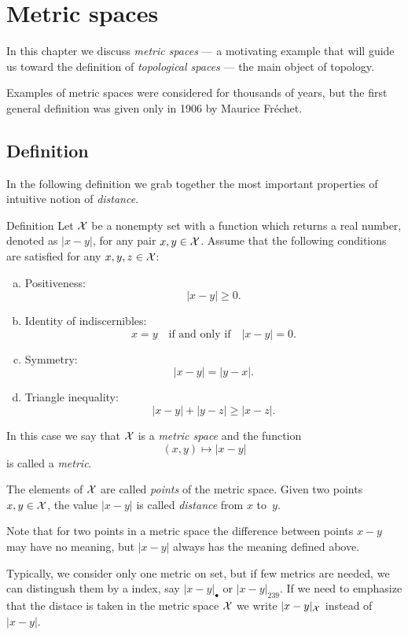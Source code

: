 \chapter{Metric spaces}

In this chapter we discuss \emph{metric spaces} --- 
a motivating example that will guide us toward the definition of \emph{topological spaces} --- the main object of topology.

Examples of metric spaces were considered for thousands of years,
but the first general definition was given only in 1906 by Maurice Fr\'echet.

\section{Definition}

In the following definition we grab together the most important properties of intuitive notion of \emph{distance}.

\begin{thm}{Definition}\label{def:metric-space}
Let $\mathcal X$ be a nonempty set 
with a function 
which returns a real number, denoted as $|x-y|$,
for any pair $x,y\in\mathcal X$.
Assume that the following conditions are satisfied for any
$x,y,z\in \mathcal X$:
\begin{enumerate}[(a)]
\item\label{def:metric-space:a} Positiveness: 
$$|x-y|\ge 0.$$
\item\label{def:metric-space:b} Identity of indiscernibles:  
$$x=y\quad\text{if and only if}\quad |x-y|=0.$$
\item\label{def:metric-space:c} Symmetry: $$|x-y| = |y- x|.$$
\item\label{def:metric-space:d} Triangle inequality: 
$$  |x- y| + |y- z| \ge |x-z|.$$
\end{enumerate}
In this case we say that $\mathcal X$ is a \emph{metric space} 
and the function 
\[(x,y)\mapsto |x-y|\] 
is called a \emph{metric}. 

The elements of $\mathcal X$ are called \emph{points} of the metric space.
Given two points $x,y\z\in \c X$, 
the value $|x-y|$ is called \emph{distance} from $x$ to~$y$.
\end{thm}

Note that for two points in a metric space  the difference between points $x-y$ may have no meaning,
but $|x-y|$ always has the meaning defined above.

Typically, we consider only one metric on set, 
but if few metrics are needed, we can distingush them by a index, say  $|x-y|_{\bullet}$ or $|x-y|_{239}$.
If we need to emphasize that the distace is taken in the metric space $\mathcal{X}$ we write $|x-y|_{\mathcal X}$ instead of $|x-y|$.

